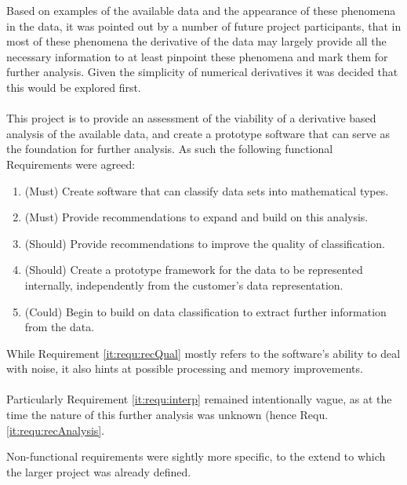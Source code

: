 \documentclass[main.tex]{subfiles}
\begin{document}
    Based on examples of the available data and the appearance of these phenomena in the data, it was pointed out by a number of future project participants, that in most of these phenomena the derivative of the data may largely provide all the necessary information to at least pinpoint these phenomena and mark them for further analysis. Given the simplicity of numerical derivatives it was decided that this would be explored first.
    \\\\ 
    This project is to provide an assessment of the viability of a derivative based analysis of the available data, and create a prototype software that can serve as the foundation for further analysis. As such the following functional Requirements were agreed:
    
    \begin{enumerate}
      \item \label{it:requ:classify} (Must) Create software that can classify data sets into mathematical types.
      \item \label{it:requ:recAnalysis} (Must) Provide recommendations to expand and build on this analysis.
      \item \label{it:requ:recQual} (Should) Provide recommendations to improve the quality of classification.
      \item \label{it:requ:data} (Should) Create a prototype framework for the data to be represented internally, independently from the customer's data representation.
      \item  \label{it:requ:interp} (Could) Begin to build on data classification to extract further information from the data.
    \end{enumerate}
    
    While Requirement \ref{it:requ:recQual} mostly refers to the software's ability to deal with noise, it also hints at possible processing and memory improvements.
    \\\\
    Particularly Requirement \ref{it:requ:interp} remained intentionally vague, as at the time the nature of this further analysis was unknown (hence Requ. \ref{it:requ:recAnalysis}.
    
    Non-functional requirements were sightly more specific, to the extend to which the larger project was already defined.
    
\end{document}
